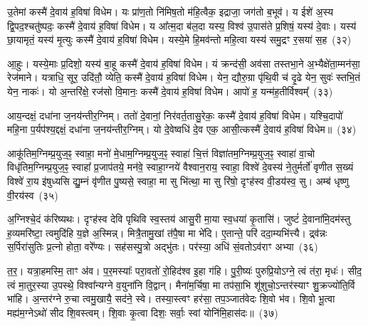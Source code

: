 उ॒तेमां कस्मै॑ दे॒वाय॑ ह॒विषा॑ विधेम। यः प्रा॑ण॒तो नि॑मिष॒तो म॑हि॒त्वैक॒ इद्राजा॒ जग॑तो ब॒भूव॑। य ईशे॑ अ॒स्य द्वि॒पद॒श्चतु॑ष्पदः॒ कस्मै॑ दे॒वाय॑ ह॒विषा॑ विधेम। य आ᳚त्म॒दा ब॑ल॒दा यस्य॒ विश्व॑ उ॒पास॑ते प्र॒शिषं॒ यस्य॑ दे॒वाः। यस्य॑ छा॒यामृतं॒ यस्य॑ मृ॒त्युः कस्मै॑ दे॒वाय॑ ह॒विषा॑ विधेम। यस्ये॒मे हि॒मव॑न्तो महि॒त्वा यस्य॑ समु॒द्रꣳ र॒सया॑ स॒ह~(३२)

आ॒हुः। यस्ये॒माः प्र॒दिशो॒ यस्य॑ बा॒हू कस्मै॑ दे॒वाय॑ ह॒विषा॑ विधेम। यं क्रन्द॑सी॒ अव॑सा तस्तभा॒ने अ॒भ्यैक्षे॑ता॒म्मन॑सा॒ रेज॑माने। यत्राधि॒ सूर॒ उदि॑तौ॒ व्येति॒ कस्मै॑ दे॒वाय॑ ह॒विषा॑ विधेम। येन॒ द्यौरु॒ग्रा पृ॑थि॒वी च॑ दृ॒ढे येन॒ सुवः॑ स्तभि॒तं येन॒ नाकः॑। यो अ॒न्तरि॑क्षे॒ रज॑सो वि॒मानः॒ कस्मै॑ दे॒वाय॑ ह॒विषा॑ विधेम। आपो॑ ह॒ यन्म॑ह॒तीर्विश्वम्᳚~(३३)

आय॒न्दक्षं॒ दधा॑ना ज॒नय॑न्तीर॒ग्निम्। ततो॑ दे॒वानां॒ निर॑वर्त॒तासु॒रेकः॒ कस्मै॑ दे॒वाय॑ ह॒विषा॑ विधेम। यश्चि॒दापो॑ महि॒ना प॒र्यप॑श्य॒द्दक्षं॒ दधा॑ना ज॒नय॑न्तीर॒ग्निम्। यो दे॒वेष्वधि॑ दे॒व एक॒ आसी॒त्कस्मै॑ दे॒वाय॑ ह॒विषा॑ विधेम॥~(३४)

{\anuvakamend[{अ॒ग्नेः स सर॑स्वती॒ द्याꣳ स॒ह विश्व॒ञ्चतु॑स्त्रिHꣳशश्च}]}%

आकू॑तिम॒ग्निम्प्र॒युज॒ꣴ॒ स्वाहा॒ मनो॑ मे॒धाम॒ग्निम्प्र॒युज॒ꣴ॒ स्वाहा॑ चि॒त्तं विज्ञा॑तम॒ग्निम्प्र॒युज॒ꣴ॒ स्वाहा॑ वा॒चो विधृ॑तिम॒ग्निम्प्र॒युज॒ꣴ॒ स्वाहा᳚ प्र॒जाप॑तये॒ मन॑वे॒ स्वाहा॒ग्नये॑ वैश्वान॒राय॒ स्वाहा॒ विश्वे॑ दे॒वस्य॑ ने॒तुर्मर्तो॑ वृणीत स॒ख्यं विश्वे॑ रा॒य इ॑षुध्यसि द्यु॒म्नं वृ॑णीत पु॒ष्यसे॒ स्वाहा॒ मा सु भि॑त्था॒ मा सु रि॑षो॒ दृꣳह॑स्व वी॒डय॑स्व॒ सु। अम्ब॑ धृष्णु वी॒रय॑स्व~(३५)

अ॒ग्निश्चे॒दं क॑रिष्यथः। दृꣳह॑स्व देवि पृथिवि स्व॒स्तय॑ आसु॒री मा॒या स्व॒धया॑ कृ॒तासि॑। जुष्टं॑ दे॒वाना॑मि॒दम॑स्तु ह॒व्यमरि॑ष्टा॒ त्वमुदि॑हि य॒ज्ञे अ॒स्मिन्न्। मित्रै॒तामु॒खां त॑पै॒षा मा भे॑दि। ए॒तान्ते॒ परि॑ ददा॒म्यभि॑त्त्यै। द्र्व॑न्नः स॒र्पिरा॑सुतिः प्र॒त्नो होता॒ वरे᳚ण्यः। सह॑सस्पु॒त्रो अद्भु॑तः। पर॑स्या॒ अधि॑ सं॒वतो\-ऽव॑राꣳ अभ्या~(३६)

त॒र॒। यत्रा॒हमस्मि॒ ताꣳ अ॑व। प॒र॒मस्याः᳚ परा॒वतो॑ रो॒हिद॑श्व इ॒हा ग॑हि। पु॒री॒ष्यः॑ पुरुप्रि॒यो\-ऽग्ने॒ त्वं त॑रा॒ मृधः॑। सीद॒ त्वं मा॒तुर॒स्या उ॒पस्थे॒ विश्वा᳚न्यग्ने व॒युना॑नि वि॒द्वान्। मैना॑म॒र्चिषा॒ मा तप॑सा॒भि शू॑शुचो॒\-ऽन्तर॑स्याꣳ शु॒क्रज्यो॑ति॒र्वि भा॑हि। अ॒न्तर॑ग्ने रु॒चा त्वमु॒खायै॒ सद॑ने॒ स्वे। तस्या॒स्त्वꣳ हर॑सा॒ तप॒ञ्जात॑वेदः शि॒वो भ॑व। शि॒वो भू॒त्वा मह्य॑म॒ग्ने\-ऽथो॑ सीद शि॒वस्त्वम्। शि॒वाः कृ॒त्वा दिशः॒ सर्वाः॒ स्वां योनि॑मि॒हास॑दः॥~(३७)

{\anuvakamend[{वी॒रय॒स्वा तप॑न्विꣳश॒तिश्च॑}]}%


